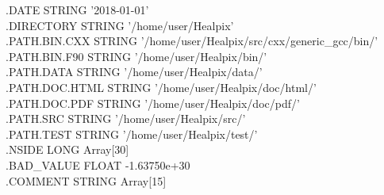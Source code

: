 \begin{example}
{{{{  .DATE              \hspace{3em}     STRING  \hspace{2em}   '2018-01-01'   \\
  .DIRECTORY         \hspace{3em}     STRING  \hspace{2em}   '/home/user/Healpix'   \\
  .PATH.BIN.CXX      \hspace{3em}     STRING  \hspace{2em}   '/home/user/Healpix/src/cxx/generic\_gcc/bin/'\\
  .PATH.BIN.F90      \hspace{3em}     STRING  \hspace{2em}   '/home/user/Healpix/bin/'   \\
  .PATH.DATA         \hspace{3em}     STRING  \hspace{2em}   '/home/user/Healpix/data/'   \\
  .PATH.DOC.HTML     \hspace{3em}     STRING  \hspace{2em}   '/home/user/Healpix/doc/html/'   \\
  .PATH.DOC.PDF      \hspace{3em}     STRING  \hspace{2em}   '/home/user/Healpix/doc/pdf/'   \\
  .PATH.SRC          \hspace{3em}     STRING  \hspace{2em}   '/home/user/Healpix/src/'   \\
  .PATH.TEST         \hspace{3em}     STRING  \hspace{2em}   '/home/user/Healpix/test/'   \\
  .NSIDE             \hspace{3em}     LONG    \hspace{2em}   Array[30]   \\
  .BAD\_VALUE        \hspace{3em}     FLOAT   \hspace{2em}    -1.63750e+30   \\
  .COMMENT           \hspace{3em}     STRING  \hspace{2em}   Array[15]   
}}
}}
\end{example}



